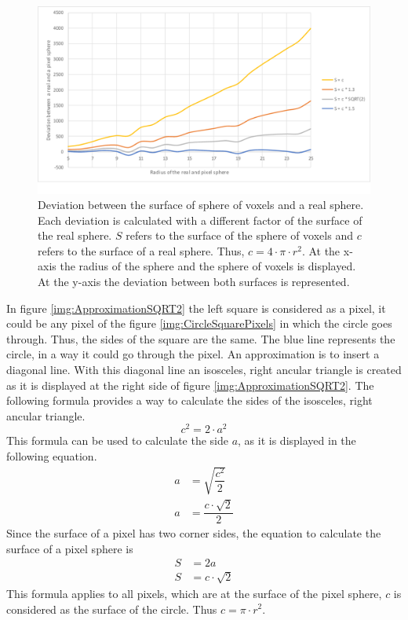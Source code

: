 \begin{figure}
	\center
	\includegraphics[scale=0.3]{figures/DeviationSphereToPixelSphere.png}
	\caption{Deviation between the surface of sphere of voxels and a real sphere. Each deviation is calculated with a different factor of the surface of the real sphere. $S$ refers to the surface of the sphere of voxels and $c$ refers to the surface of a real sphere. Thus, $c = 4 \cdot \pi \cdot r^{2}$. \newline
	At the x-axis the radius of the sphere and the sphere of voxels is displayed. At the y-axis the deviation between both surfaces is represented.}
	\label{img:DeviationSphere}
\end{figure}

In figure \ref{img:ApproximationSQRT2} the left square is considered as a pixel, it could be any pixel of the figure \ref{img:CircleSquarePixels} in which the circle goes through. Thus, the sides of the square are the same. The blue line represents the circle, in a way it could go through the pixel. An approximation is to insert a diagonal line. With this diagonal line an isosceles, right ancular triangle is created as it is displayed at the right side of figure \ref{img:ApproximationSQRT2}. \newline
The following formula provides a way to calculate the sides of the isosceles, right ancular triangle.
\begin{equation}\label{eq:IsoscelesRightAncularTriangle}
c^{2} = 2 \cdot a^{2}
\end{equation}
This formula can be used to calculate the side $a$, as it is displayed in the following equation.
\begin{equation}\label{eq:CornerSideAOfTriangle}
\begin{split}
a &= \sqrt{\dfrac{c^{2}}{2}} \\
a &= \dfrac{c \cdot \sqrt{2}}{2}
\end{split}
\end{equation}
Since the surface of a pixel has two corner sides, the equation to calculate the surface of a pixel sphere is
\begin{equation}\label{eq:PixelSurfaceCalculation}
\begin{split}
S &= 2a \\
S &= c \cdot \sqrt{2}
\end{split}
\end{equation}
This formula applies to all pixels, which are at the surface of the pixel sphere, $c$ is considered as the surface of the circle. Thus $c = \pi \cdot r^{2}$.

